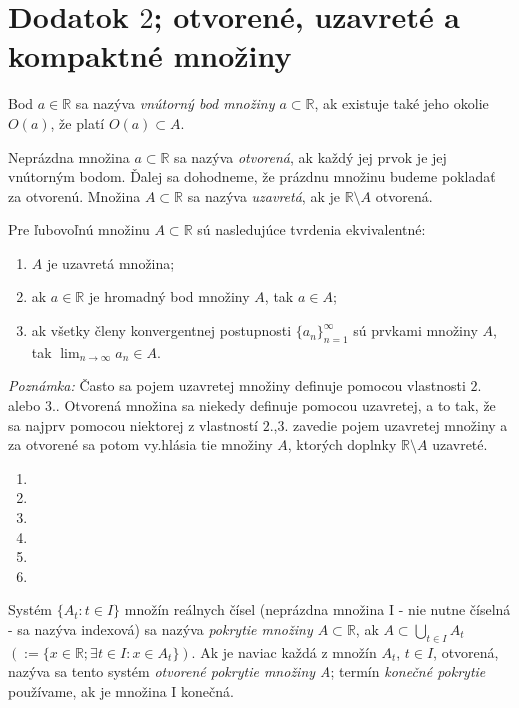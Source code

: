 \chapter{Dodatok $2$; otvorené, uzavreté a kompaktné množiny}%

Bod $a \in \mathbb{R}$ sa nazýva \textit{vnútorný bod množiny $a \subset \mathbb{R}$}, ak existuje také jeho okolie $O(a)$, že platí $O(a) \subset A$.

Neprázdna množina $a \subset \mathbb{R}$ sa nazýva \textit{otvorená}, ak každý jej prvok je jej vnútorným bodom. Ďalej sa dohodneme, že prázdnu množinu budeme pokladať za otvorenú.
Množina $A \subset \mathbb{R}$ sa nazýva \textit{uzavretá}, ak je $\mathbb{R} \setminus A$ otvorená.

\begin{veta}
Pre ľubovoľnú množinu $A \subset \mathbb{R}$ sú nasledujúce tvrdenia ekvivalentné:
\begin{enumerate}
\item $A$ je uzavretá množina;
\item ak $a \in \mathbb{R}$ je hromadný bod množiny $A$, tak $a \in A$;
\item ak všetky členy konvergentnej postupnosti ${\{a_n\}}_{n=1}^\infty$ sú prvkami množiny $A$, tak $\lim_{n \rightarrow \infty} a_n \in A$.
\end{enumerate}
\end{veta}

\textit{Poznámka:}
Často sa pojem uzavretej množiny definuje pomocou vlastnosti $2.$ alebo $3.$. Otvorená množina sa niekedy definuje pomocou uzavretej, a to tak, že sa najprv pomocou niektorej z vlastností $2.$,$3.$ zavedie pojem uzavretej množiny a za otvorené sa potom vy.hlásia tie množiny $A$, ktorých doplnky $\mathbb{R} \setminus A$ uzavreté.

\begin{enumerate}[resume]
	\item {}
	\item {}
	\item {}
	\item {}
	\item {}
	\item {}
\end{enumerate}

Systém $\{A_t: t \in I\}$ množín reálnych čísel (neprázdna množina I - nie nutne číselná - sa nazýva indexová) sa nazýva \textit{pokrytie množiny $A \subset \mathbb{R}$}, ak $A \subset \bigcup_{t \in I} A_t$  $(:= \{x \in \mathbb{R}; \exists t \in I: x \in A_t\})$. Ak je naviac každá z množín $A_t$, $t \in I$, otvorená, nazýva sa tento systém \textit{otvorené pokrytie množiny A}; termín \textit{konečné pokrytie} používame, ak je množina I konečná.

